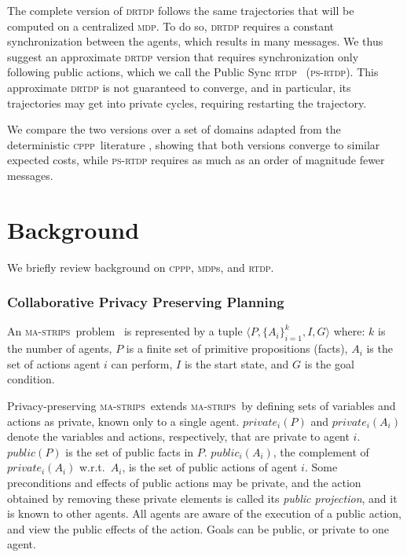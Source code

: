 \documentclass[letterpaper]{article} %
\newcommand{\mastrips}{\textsc {ma-strips}\xspace}
\newcommand{\cppp}{\textsc {cppp}\xspace}
\newcommand{\rtdp}{\textsc {rtdp}\xspace}
\newcommand{\drtdp}{\textsc {drtdp}\xspace}
\newcommand{\psrtdp}{\textsc{ps}-\textsc{rtdp}\xspace}
\newcommand{\mdps}{\textsc {mdp}s\xspace}
\newcommand{\mdp}{\textsc {mdp}\xspace}
\theoremstyle{remark}
\newcommand{\citep}[1]{\cite{#1}}
\newcommand{\commentout}[1]{}
\begin{document}
The complete version of \drtdp follows the same trajectories that will be computed on a centralized \mdp. To do so, \drtdp requires a constant synchronization between the agents, which results in many messages. We thus suggest an approximate \drtdp version that requires synchronization only following public actions, which we call the Public Sync \rtdp~ (\psrtdp). This approximate \drtdp is not guaranteed to converge, and in particular, its trajectories may get into private cycles, requiring restarting the trajectory.

We compare the two versions over a set of domains adapted from the deterministic \cppp\ literature \cite{vstolba2015competition}, showing that both versions converge to similar expected costs, while \psrtdp requires as much as an order of magnitude fewer messages.



\section{Background}

We briefly review background on \cppp, \mdps, and \rtdp.

\subsubsection{Collaborative Privacy Preserving Planning}

An \mastrips\ problem~\citep{BrafmanD13} is represented by a tuple $\langle P, \{A_i\}_{i=1}^k, I ,G \rangle$ where:
$k$ is the number of agents, $P$ is a finite set of primitive propositions (facts), $A_i$ is the set of actions agent $i$ can perform,  $I$ is the start state, and $G$ is the goal condition.

\commentout{
Each action $a=\langle pre(a), \mathit{eff}(a) \rangle$ is defined by its preconditions ($pre(a)$), and effects ($\mathit{eff}(a)$). Preconditions and effects are conjunctions of primitive propositions and literals, respectively. A state is a truth assignment over $P$.  $G$ is a conjunction of facts. $a(s)$ denotes the result of applying action $a$ to state $s$. A {\em plan} $\pi=(a_1,\ldots,a_k)$ is a solution to a planning task iff $G\subseteq a_k(\ldots(a_1(I)\ldots)$.
}
Privacy-preserving \mastrips\ extends \mastrips\ by defining sets of variables and actions as private, known only to a single agent. $private_i(P)$ and $private_i(A_i)$ denote the variables and actions, respectively, that are private to agent $i$. $public(P)$ is the set of public facts in $P$. $public_i(A_i)$, the complement of $private_i(A_i)$ w.r.t.~$A_i$, is the set of public actions of agent $i$. Some preconditions and effects of public actions may be private, and the action obtained by removing these private elements is called its {\em public projection\/}, and it is known to other agents. All agents are aware of the execution of a public action, and view the public effects of the action. Goals can be public, or private to one agent.
\end{document}
